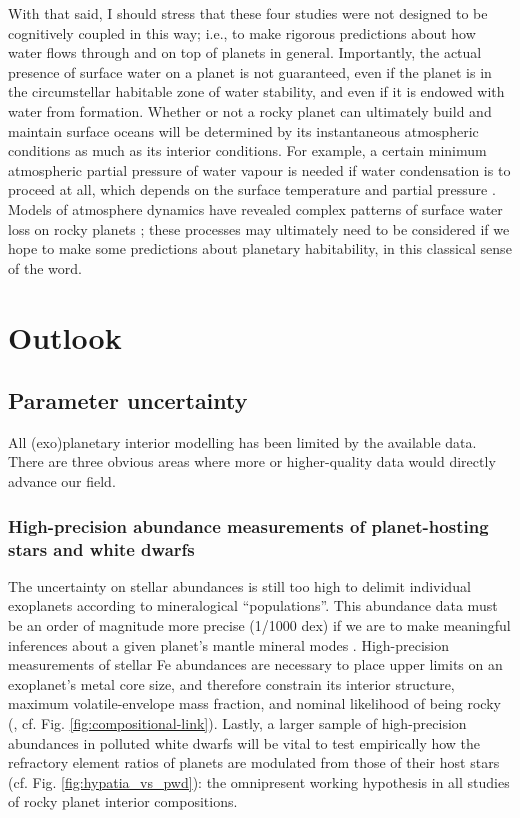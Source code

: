With that said, I should stress that these four studies were not designed to be cognitively coupled in this way; i.e., to make rigorous predictions about how water flows through and on top of planets in general. Importantly, the actual presence of surface water on a planet is not guaranteed, even if the planet is in the circumstellar habitable zone of water stability, and even if it is endowed with water from formation. Whether or not a rocky planet can ultimately build and maintain surface oceans will be determined by its instantaneous atmospheric conditions as much as its interior conditions. For example, a certain minimum atmospheric partial pressure of water vapour is needed if water condensation is to proceed at all, which depends on the surface temperature and  partial pressure \citep{miyazaki_inefficient_2022, miyazaki_wet_2022}. Models of atmosphere dynamics have revealed complex patterns of surface water loss on rocky planets \citep[e.g.,][]{lobo_terminator_2023}; these processes may ultimately need to be considered if we hope to make some predictions about planetary habitability, in this classical sense of the word. 


\section{Outlook}

\subsection{Parameter uncertainty}

All (exo)planetary interior modelling has been limited by the available data. There are three obvious areas where more or higher-quality data would directly advance our field.


\subsubsection{High-precision abundance measurements of planet-hosting stars and white dwarfs}


The uncertainty on stellar abundances is still too high to delimit individual exoplanets according to mineralogical ``populations''. This abundance data must be an order of magnitude more precise (1/1000 dex) if we are to make meaningful inferences about a given planet's mantle mineral modes \citep{hinkel_star_2018}. High-precision measurements of stellar Fe abundances are necessary to place upper limits on an exoplanet's metal core size, and therefore constrain its interior structure, maximum volatile-envelope mass fraction, and nominal likelihood of being rocky (\citealt{schulze_probability_2020, unterborn_nominal_2023}, cf. Fig. \ref{fig:compositional-link}). Lastly, a larger sample of high-precision abundances in polluted white dwarfs will be vital to test empirically how the refractory element ratios of planets are modulated from those of their host stars (cf. Fig. \ref{fig:hypatia_vs_pwd}): the omnipresent working hypothesis in all studies of rocky planet interior compositions. 


